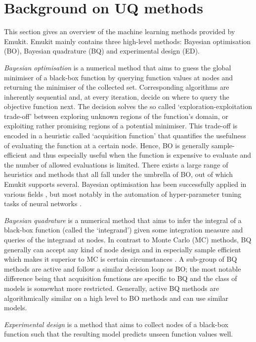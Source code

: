 \section{Background on UQ methods}\label{sec:background}

This section gives an overview of the machine learning methods provided by Emukit.
Emukit mainly contains three high-level methods: Bayesian optimisation (BO), Bayesian quadrature (BQ) and experimental design (ED).

\emph{Bayesian optimisation} \cite{Mockus1978, Garnett2023} is a numerical method that aims to guess the global minimiser of a black-box function by querying function values at nodes and returning the minimiser of the collected set. Corresponding algorithms are inherently sequential and, at every iteration, decide on where to query the objective function next. The decision solves the so called `exploration-exploitation trade-off' between exploring unknown regions of the function's domain, or exploiting rather promising regions of a potential minimiser. This trade-off is encoded in a heuristic called `acquisition function' that quantifies the usefulness of evaluating the function at a certain node. Hence, BO is generally sample-efficient and thus especially useful when the function is expensive to evaluate and the number of allowed evaluations is limited. There exists a large range of heuristics and methods that all fall under the umbrella of BO, out of which Emukit supports several. Bayesian optimisation has been successfully applied in various fields , but most notably in the automation of hyper-parameter tuning tasks of neural networks \cite{snoek2012practical}.

\emph{Bayesian quadrature} \cite{Diaconis1988, OHagan1992, pnbook22} is a numerical method that aims to infer the integral of a black-box function (called the `integrand') given some integration measure and queries of the integrand at nodes. In contrast to Monte Carlo (MC) methods, BQ generally can accept any kind of node design and in especially sample efficient which makes it superior to MC is certain circumstances \cite{RasmussenGhahramani2002}. A sub-group of BQ methods are active and follow a similar decision loop as BO; the most notable difference being that acquisition functions are specific to BQ and the class of models is somewhat more restricted. Generally, active BQ methods are algorithmically similar on a high level to BO methods and can use similar models.

\emph{Experimental design} \cite{Kennedy2000, Kennedy2001, Conti2009, Conti2010} is a method that aims to collect nodes of a black-box function such that the resulting model predicts unseen function values well. 

